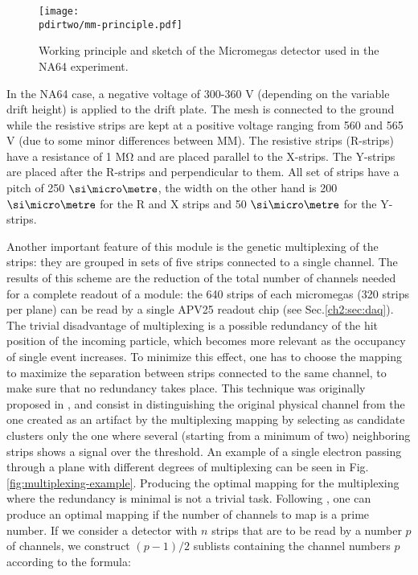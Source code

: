 \begin{figure}[bth!]
  \centering
  \texttt{[image: \\pdirtwo/mm-principle.pdf]}
\caption[Micromegas sketch]{Working principle and sketch of the Micromegas detector used in the NA64 experiment.}
\label{fig:mm-sketch}
\end{figure}

In the NA64 case, a negative voltage of 300-360 \si{\volt} (depending on the variable drift height) is applied to the drift plate. The mesh is connected to the ground while the resistive strips are kept at a positive voltage ranging from 560 and 565 \si{\volt} (due to some minor differences between MM). The resistive strips (R-strips) have a resistance of 1 \si{\mega\ohm} and are placed parallel to the X-strips. The Y-strips are placed after the R-strips and perpendicular to them. All set of strips have a pitch of 250 $\mum$, the width on the other hand is 200 $\mum$ for the R and X strips and 50 $\mum$ for the Y-strips.

Another important feature of this module is the genetic multiplexing of the strips: they are grouped in sets of five strips connected to a single channel. The results of this scheme are the reduction of the total number of channels needed for a complete readout of a module: the 640 strips of each micromegas (320 strips per plane) can be read by a single APV25 readout chip (see Sec.\ref{ch2:sec:daq}). The trivial disadvantage of multiplexing is a possible redundancy of the hit position of the incoming particle, which becomes more relevant as the occupancy of single event increases. To minimize this effect, one has to choose the mapping to maximize the separation between strips connected to the same channel, to make sure that no redundancy takes place. This technique was originally proposed in \cite{Procureur:2013yea}, and consist in distinguishing the original physical channel from the one created as an artifact by the multiplexing mapping by selecting as candidate clusters only the one where several (starting from a minimum of two) neighboring strips shows a signal over the threshold. An example of a single electron passing through a plane with different degrees of multiplexing can be seen in Fig.\ref{fig:multiplexing-example}. Producing the optimal mapping for the multiplexing where the redundancy is minimal is not a trivial task. Following \cite{Procureur:2013yea}, one can produce an optimal mapping if the number of channels to map is a prime number. If we consider a detector with $n$ strips that are to be read by a number $p$ of channels, we construct $(p-1)/2$ sublists containing the channel numbers $p$ according to the formula:

